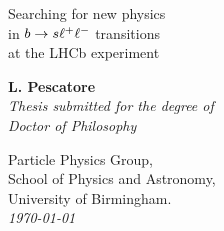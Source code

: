 \documentclass[a4paper,twoside,12pt]{report}
\newcommand{\thesistitle}{
Searching for new physics  \\
in $\bquark\to\squark\ll$ transitions \\
 at the LHCb experiment
 }
\newcommand{\thesisauthor}{L. Pescatore} %
\newcommand{\thesiscrest}{crest_1}
\begin{document}
\begin{titlepage}
  \begin{center}
    \huge\sc\linespread{2} \thesistitle\\
    \end{center}
    \begin{center}
    \vspace{3.0cm}
    {\Large\bf \thesisauthor}\\
    \vspace{1.5cm}
    {\large\em Thesis submitted for the degree of}\\
    {\large\em Doctor of Philosophy}\\
    \vspace{1.5cm}
  \end{center}
  \begin{center}
  \end{center}
  \begin{flushleft}
    \hspace{7.5cm} Particle Physics Group, \\
    \hspace{7.5cm} School of Physics and Astronomy, \\
    \hspace{7.5cm} University of Birmingham. \\
    \vspace{1cm}
    \hspace{7.5cm} \emph{\today} \\
  \end{flushleft}
  \begin{center}
  \end{center}
\end{titlepage}

\thispagestyle{empty}%
~
\newpage


\pagestyle{fancy} %
\fancyfoot{} %
\fancyhead{}
\fancyhead[RE]{\sf \slshape \rightmark \hspace{5mm} \thepage }
\fancyhead[LO]{\sf \thepage \hspace{5mm} \slshape \leftmark }

\setcounter{tocdepth}{3}
\setcounter{secnumdepth}{3}
\renewcommand\tocloftpagestyle{fancy}
\renewcommand\cftchapfont{\large\sf}
\renewcommand\cftsecfont{\normalsize \sf}
\renewcommand\cftsubsecfont{\small\sf}
\renewcommand\cftsubsubsecfont{\footnotesize \sf}
%
\renewcommand\cftchappagefont{\bfseries\sffamily}
\renewcommand\cftsecpagefont{\bfseries\sffamily}
\renewcommand\cftsubsecpagefont{\bfseries\sffamily}
\renewcommand\cftsubsubsecpagefont{\bfseries\sffamily}
%
\renewcommand\cftloftitlefont{\Huge\sf}
\renewcommand\cftlottitlefont{\Huge\sf}
\renewcommand\cfttoctitlefont{\Huge\sf}
\end{document}

